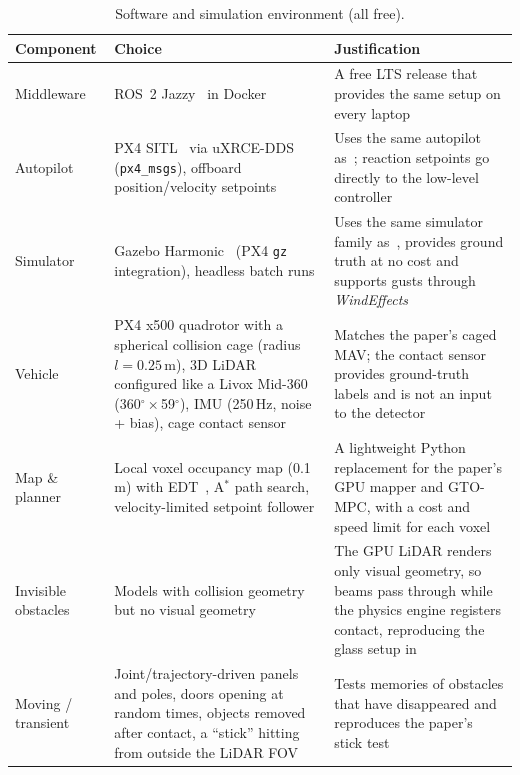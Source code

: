 \documentclass[conference,10pt]{IEEEtran}
\begin{document}
\begin{table}[t]
\caption{Software and simulation environment (all free).}
\label{tab:env}
\footnotesize
\begin{tabularx}{\columnwidth}{@{}L{1.45cm}YY@{}}
\toprule
\textbf{Component} & \textbf{Choice} & \textbf{Justification}\\
\midrule
Middleware & ROS~2 Jazzy~\cite{ros2} in Docker & A free LTS release that provides the same setup on every laptop\\
Autopilot & PX4 SITL~\cite{px4} via uXRCE-DDS (\texttt{px4\_msgs}), offboard position/velocity setpoints & Uses the same autopilot as~\cite{airbumper}; reaction setpoints go directly to the low-level controller\\
Simulator & Gazebo Harmonic~\cite{gazebo} (PX4 \texttt{gz} integration), headless batch runs & Uses the same simulator family as~\cite{airbumper}, provides ground truth at no cost and supports gusts through \emph{WindEffects}\\
Vehicle & PX4 x500 quadrotor with a spherical collision cage (radius $l=0.25$\,m), 3D LiDAR configured like a Livox Mid-360 (360$^\circ\times$59$^\circ$), IMU (250\,Hz, noise + bias), cage contact sensor & Matches the paper's caged MAV; the contact sensor provides ground-truth labels and is not an input to the detector\\
Map \& planner & Local voxel occupancy map (0.1\,m) with EDT~\cite{edt}, A$^*$ path search, velocity-limited setpoint follower & A lightweight Python replacement for the paper's GPU mapper and GTO-MPC, with a cost and speed limit for each voxel\\
Invisible obstacles & Models with collision geometry but no visual geometry & The GPU LiDAR renders only visual geometry, so beams pass through while the physics engine registers contact, reproducing the glass setup in~\cite{airbumper}\\
Moving / transient & Joint/trajectory-driven panels and poles, doors opening at random times, objects removed after contact, a ``stick'' hitting from outside the LiDAR FOV & Tests memories of obstacles that have disappeared and reproduces the paper's stick test\\
\bottomrule
\end{tabularx}
\end{table}
\end{document}
